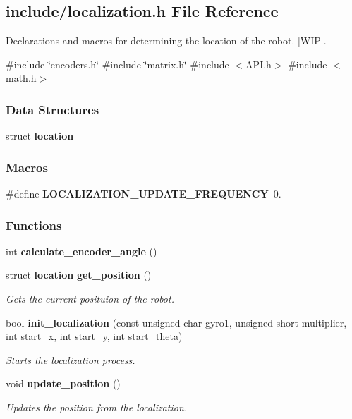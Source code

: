 \subsection{include/localization.h File Reference}
\label{localization_8h}


Declarations and macros for determining the location of the robot. [W\+IP].  


{\ttfamily \#include \char`\"{}encoders.\+h\char`\"{}}\newline
{\ttfamily \#include \char`\"{}matrix.\+h\char`\"{}}\newline
{\ttfamily \#include $<$A\+P\+I.\+h$>$}\newline
{\ttfamily \#include $<$math.\+h$>$}\newline
\subsubsection*{Data Structures}
\begin{DoxyCompactItemize}
\item 
struct \textbf{ location}
\end{DoxyCompactItemize}
\subsubsection*{Macros}
\begin{DoxyCompactItemize}
\item 
\#define \textbf{ L\+O\+C\+A\+L\+I\+Z\+A\+T\+I\+O\+N\+\_\+\+U\+P\+D\+A\+T\+E\+\_\+\+F\+R\+E\+Q\+U\+E\+N\+CY}~0.
\end{DoxyCompactItemize}
\subsubsection*{Functions}
\begin{DoxyCompactItemize}
\item 
int \textbf{ calculate\+\_\+encoder\+\_\+angle} ()
\item 
struct \textbf{ location} \textbf{ get\+\_\+position} ()
\begin{DoxyCompactList}\small\item\em Gets the current posituion of the robot. \end{DoxyCompactList}\item 
bool \textbf{ init\+\_\+localization} (const unsigned char gyro1, unsigned short multiplier, int start\+\_\+x, int start\+\_\+y, int start\+\_\+theta)
\begin{DoxyCompactList}\small\item\em Starts the localization process. \end{DoxyCompactList}\item 
void \textbf{ update\+\_\+position} ()
\begin{DoxyCompactList}\small\item\em Updates the position from the localization. \end{DoxyCompactList}\end{DoxyCompactItemize}


